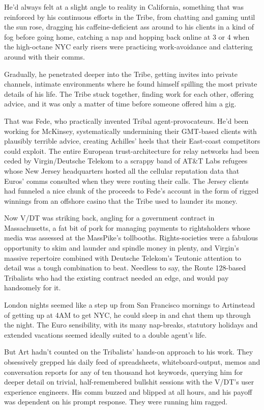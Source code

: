 He’d always felt at a slight angle to reality in California,
something that was reinforced by his continuous efforts in the
Tribe, from chatting and gaming until the sun rose, dragging his
caffeine-deficient ass around to his clients in a kind of fog
before going home, catching a nap and hopping back online at 3 or 4
when the high-octane NYC early risers were practicing
work-avoidance and clattering around with their comms.

Gradually, he penetrated deeper into the Tribe, getting invites
into private channels, intimate environments where he found himself
spilling the most private details of his life. The Tribe stuck
together, finding work for each other, offering advice, and it was
only a matter of time before someone offered him a gig.

That was Fede, who practically invented Tribal agent-pro\-vo\-ca\-teurs.
He’d been working for McKinsey, systematically undermining their
GMT-based clients with plausibly terrible advice, creating
Achilles’ heels that their East-coast competitors could exploit.
The entire European trust-architecture for relay networks had been
ceded by Virgin/Deutsche Te\-le\-kom to a scrappy band of AT\&T Labs
refugees whose New Jersey headquarters hosted all the cellular
reputation data that Euros’ comms consulted when they were routing
their calls. The Jersey clients had funneled a nice chunk of the
proceeds to Fede’s account in the form of rigged winnings from an
offshore casino that the Tribe used to launder its money.

Now V/DT was striking back, angling for a government contract in
Massachusetts, a fat bit of pork for managing payments to
rightsholders whose media was assessed at the MassPike’s
tollbooths. Rights-societies were a fabulous opportunity to skim
and launder and spindle money in plenty, and Virgin’s massive
repertoire combined with Deutsche Telekom’s Teutonic attention to
detail was a tough combination to beat. Needless to say, the Route
128-based Tribalists who had the existing contract needed an edge,
and would pay handsomely for it.

London nights seemed like a step up from San Francisco mornings to
Art{\dash}instead of getting up at 4AM to get NYC, he could sleep in and
chat them up through the night. The Euro sensibility, with its many
nap-breaks, statutory holidays and extended vacations seemed
ideally suited to a double agent’s life.

But Art hadn’t counted on the Tribalists’ hands-on approach to his
work. They obsessively grepped his daily feed of spreadsheets,
white\-board-output, memos and conversation reports for any of ten
thousand hot keywords, querying him for deeper detail on trivial,
half-remembered bullshit sessions with the V/DT’s user experience
engineers. His comm buzzed and blipped at all hours, and his payoff
was dependent on his prompt response. They were running him
ragged.

